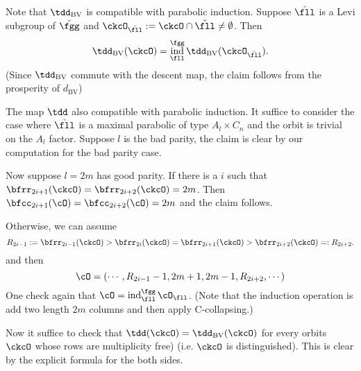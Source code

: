 \documentclass[12pt,a4paper]{amsart}
\DeclareMathOperator{\ind}{ind}
\numberwithin{equation}{section}
\theoremstyle{remark}
\def\dBV{d_{\mathrm{BV}}}
\begin{document}
{Note that $\tdBV$ is compatible with parabolic induction.
Suppose $\ckfll$ is a Levi subgroup of $\ckfgg$ and
$\ckcO_{\ckfll}:=\ckcO\cap \ckfll\neq \emptyset$.
Then
\[
\tdBV(\ckcO) = \ind_{\fll}^{\fgg} \tdBV(\ckcO_{\ckfll}).
\]
(Since $\tdBV$ commute with the descent map, the claim follows from the
prosperity of $\dBV$)

The map $\tdd$ also compatible with parabolic induction.
It suffice to consider the case where $\ckfll$ is a maximal parabolic of type
$A_{l}\times C_{n}$ and
the orbit is trivial on the $A_{l}$ factor.
Suppose $l$ is the bad parity, the claim is clear by our computation for the bad
parity case.

Now suppose $l=2m$ has good parity. If there is a $i$ such that
$\bfrr_{2i+1}(\ckcO)=\bfrr_{2i+2}(\ckcO)=2m$. Then
$\bfcc_{2i+1}(\cO)=\bfcc_{2i+2}(\cO)=2m$ and the claim follows.

Otherwise, we can assume
\[
R_{2i-1}:=\bfrr_{2i-1}(\ckcO)> \bfrr_{2i}(\ckcO)=\bfrr_{2i+1}(\ckcO) > \bfrr_{2i+2}(\ckcO)=:R_{2i+2}.
\]
and then
\[
\cO = (\cdots, R_{2i-1}-1, 2m+1, 2m-1, R_{2i+2}, \cdots)
\]
One check again that $\cO = \ind_{\fll}^{\fgg}\cO_{\fll}$.
(Note that the induction operation is add two length $2m$ columns and then apply
C-collapsing.)

Now it suffice to check that
$\tdd(\ckcO) = \tdBV(\ckcO)$ for every orbits $\ckcO$ whose
rows are multiplicity free) (i.e. $\ckcO$ is distinguished).
This is clear by the explicit formula for the both sides.
}



\end{document}
